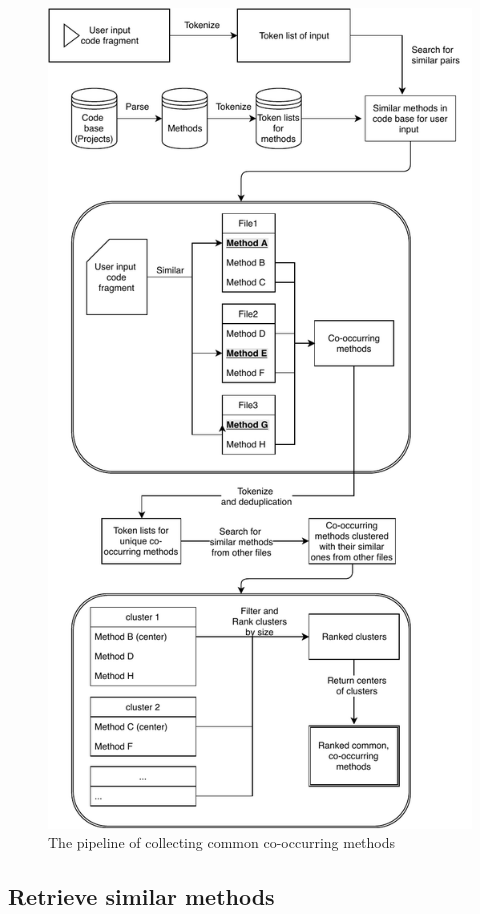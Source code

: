 \begin{figure}
	\includegraphics[width=\linewidth]{figures/pipeline.pdf}
	\caption{The pipeline of collecting common co-occurring methods}
	\label{fig:pipeline}
\end{figure}

\subsection{Retrieve similar methods}
